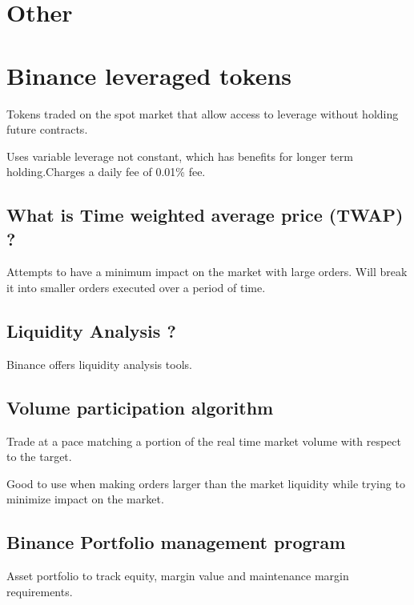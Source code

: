 \documentclass[11pt]{scrartcl} %
\begin{document}
\section{Other}

\section{Binance leveraged tokens}

Tokens traded on the spot market that allow access to leverage without holding future contracts.

Uses variable leverage not constant, which has benefits for longer term holding.Charges a daily fee of
0.01\% fee.

\subsection{What is Time weighted average price (TWAP) ?}

Attempts to have a minimum impact on the market with large orders. Will break it into smaller orders
executed over a period of time.

\subsection{Liquidity Analysis ?}

Binance offers liquidity analysis tools.

\subsection{Volume participation algorithm}

Trade at a pace matching a portion of the real time market volume with respect to the target.

Good to use when making orders larger than the market liquidity while trying to minimize impact on the
market.

\subsection{Binance Portfolio management program}

Asset portfolio to track equity, margin value and maintenance margin requirements.

\end{document}
